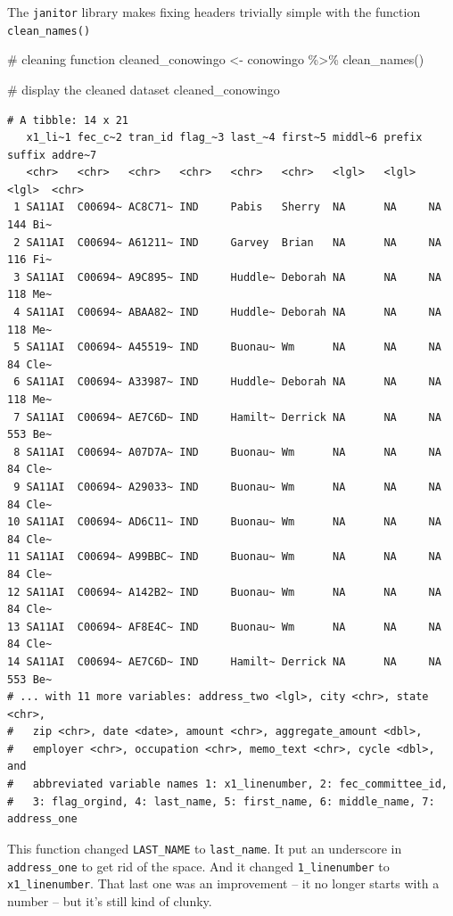 \documentclass[
  letterpaper,
  DIV=11,
  numbers=noendperiod]{scrreprt}
\newenvironment{Shaded}{\begin{snugshade}}{\end{snugshade}}
\newcommand{\CommentTok}[1]{\textcolor[rgb]{0.37,0.37,0.37}{#1}}
\newcommand{\FunctionTok}[1]{\textcolor[rgb]{0.28,0.35,0.67}{#1}}
\newcommand{\NormalTok}[1]{\textcolor[rgb]{0.00,0.23,0.31}{#1}}
\newcommand{\OtherTok}[1]{\textcolor[rgb]{0.00,0.23,0.31}{#1}}
\newcommand{\SpecialCharTok}[1]{\textcolor[rgb]{0.37,0.37,0.37}{#1}}
\begin{document}
The \texttt{janitor} library makes fixing headers trivially simple with
the function \texttt{clean\_names()}

\begin{Shaded}
\begin{Highlighting}[]
\CommentTok{\# cleaning function}
\NormalTok{cleaned\_conowingo }\OtherTok{\textless{}{-}}\NormalTok{ conowingo }\SpecialCharTok{\%\textgreater{}\%}
  \FunctionTok{clean\_names}\NormalTok{()}

\CommentTok{\# display the cleaned dataset}
\NormalTok{cleaned\_conowingo}
\end{Highlighting}
\end{Shaded}

\begin{verbatim}
# A tibble: 14 x 21
   x1_li~1 fec_c~2 tran_id flag_~3 last_~4 first~5 middl~6 prefix suffix addre~7
   <chr>   <chr>   <chr>   <chr>   <chr>   <chr>   <lgl>   <lgl>  <lgl>  <chr>  
 1 SA11AI  C00694~ AC8C71~ IND     Pabis   Sherry  NA      NA     NA     144 Bi~
 2 SA11AI  C00694~ A61211~ IND     Garvey  Brian   NA      NA     NA     116 Fi~
 3 SA11AI  C00694~ A9C895~ IND     Huddle~ Deborah NA      NA     NA     118 Me~
 4 SA11AI  C00694~ ABAA82~ IND     Huddle~ Deborah NA      NA     NA     118 Me~
 5 SA11AI  C00694~ A45519~ IND     Buonau~ Wm      NA      NA     NA     84 Cle~
 6 SA11AI  C00694~ A33987~ IND     Huddle~ Deborah NA      NA     NA     118 Me~
 7 SA11AI  C00694~ AE7C6D~ IND     Hamilt~ Derrick NA      NA     NA     553 Be~
 8 SA11AI  C00694~ A07D7A~ IND     Buonau~ Wm      NA      NA     NA     84 Cle~
 9 SA11AI  C00694~ A29033~ IND     Buonau~ Wm      NA      NA     NA     84 Cle~
10 SA11AI  C00694~ AD6C11~ IND     Buonau~ Wm      NA      NA     NA     84 Cle~
11 SA11AI  C00694~ A99BBC~ IND     Buonau~ Wm      NA      NA     NA     84 Cle~
12 SA11AI  C00694~ A142B2~ IND     Buonau~ Wm      NA      NA     NA     84 Cle~
13 SA11AI  C00694~ AF8E4C~ IND     Buonau~ Wm      NA      NA     NA     84 Cle~
14 SA11AI  C00694~ AE7C6D~ IND     Hamilt~ Derrick NA      NA     NA     553 Be~
# ... with 11 more variables: address_two <lgl>, city <chr>, state <chr>,
#   zip <chr>, date <date>, amount <chr>, aggregate_amount <dbl>,
#   employer <chr>, occupation <chr>, memo_text <chr>, cycle <dbl>, and
#   abbreviated variable names 1: x1_linenumber, 2: fec_committee_id,
#   3: flag_orgind, 4: last_name, 5: first_name, 6: middle_name, 7: address_one
\end{verbatim}

This function changed \texttt{LAST\_NAME} to \texttt{last\_name}. It put
an underscore in \texttt{address\_one} to get rid of the space. And it
changed \texttt{1\_linenumber} to \texttt{x1\_linenumber}. That last one
was an improvement -- it no longer starts with a number -- but it's
still kind of clunky.
\end{document}
